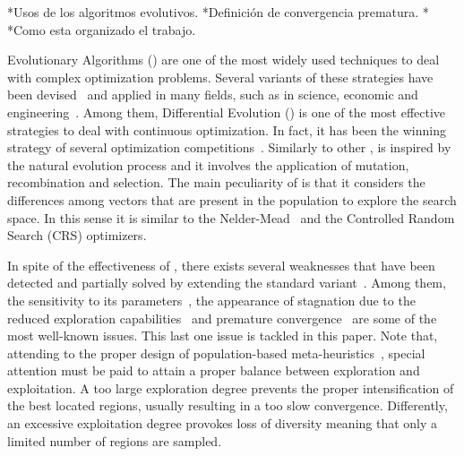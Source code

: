 *Usos de los algoritmos evolutivos.
*Definición de convergencia prematura.
*
*Como esta organizado el trabajo.

Evolutionary Algorithms (\EAS{}) are one of the most widely used techniques to deal with complex optimization problems.
%
Several variants of these strategies have been devised~\cite{Talbi:09} and applied in many fields, such as in science, 
economic and engineering~\cite{chakraborty2008advances}.
%
Among them, Differential Evolution (\DE{}) \cite{storn1997differential} is one of the most effective strategies to deal
with continuous optimization.
%
In fact, it has been the winning strategy of several optimization competitions~\cite{das2011differential}.
%
Similarly to other \EAS{}, \DE{} is inspired by the natural evolution process and it involves the application of mutation, recombination and 
selection.
%
The main peculiarity of \DE{} is that it considers the differences among vectors that are present in the population to explore the search space.
%
In this sense it is similar to the Nelder-Mead~\cite{nelder1965simplex} and the 
Controlled Random Search (CRS) \cite{price1983global} optimizers.

In spite of the effectiveness of \DE{}, there exists several weaknesses that have been detected and partially
solved by extending the standard variant~\cite{das2011differential}.
%
Among them, the sensitivity to its parameters~\cite{zhang2009jade}, the appearance of stagnation due to the reduced exploration 
capabilities~\cite{sa2008exploration,lampinen2000stagnation} and premature convergence~\cite{zaharie2003control} are some of the most well-known
issues.
%
This last one issue is tackled in this paper.
%
Note that, attending to the proper design of population-based meta-heuristics~\cite{Talbi:09}, special attention must be
paid to attain a proper balance between exploration and exploitation.
%
A too large exploration degree prevents the proper intensification of the best located regions, usually resulting in a
too slow convergence.
%
Differently, an excessive exploitation degree provokes loss of diversity meaning that only a limited number of regions are sampled.


